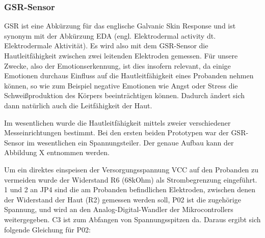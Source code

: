 \subsubsection{GSR-Sensor} \label{gsr-1}

GSR ist eine Abkürzung für das englische Galvanic Skin Response und ist synonym mit der Abkürzung EDA (engl. Elektrodermal activity dt. Elektrodermale Aktivität). Es wird also mit dem GSR-Sensor die Hautleitfähigkeit zwischen zwei leitenden Elektroden gemessen. Für unsere Zwecke, also der Emotionserkennung, ist dies insofern relevant, da einige Emotionen durchaus Einfluss auf die Hautleitfähigkeit eines Probanden nehmen können, so wie zum Beispiel negative Emotionen wie Angst oder Stress die Schweißproduktion des Körpers beeinträchtigen können. Dadurch ändert sich dann natürlich auch die Leitfähigkeit der Haut.

Im wesentlichen wurde die Hautleitfähigkeit mittels zweier verschiedener Messeinrichtungen bestimmt. Bei den ersten beiden Prototypen war der GSR-Sensor im wesentlichen ein Spannungsteiler. Der genaue Aufbau kann der Abbildung X entnommen werden. 


Um ein direktes einspeisen der Versorgungsspannung VCC auf den Probanden zu vermeiden wurde der Widerstand R6 (68kOhm) als Strombegrenzung eingeführt. 1 und 2 an JP4 sind die am Probanden befindlichen Elektroden, zwischen denen der Widerstand der Haut (R2) gemessen werden soll, P02 ist die zugehörige Spannung, und wird an den Analog-Digital-Wandler der Mikrocontrollers weitergegeben. C3 ist zum Abfangen von Spannungsspitzen da. Daraus ergibt sich folgende Gleichung für P02:


